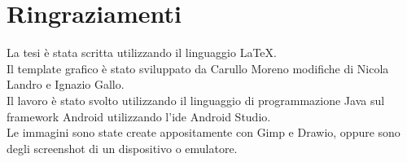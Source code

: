 \chapter*{Ringraziamenti}

La tesi è stata scritta utilizzando il linguaggio LaTeX.\\
Il template grafico è stato sviluppato da Carullo Moreno modifiche di Nicola Landro e Ignazio Gallo.\\
Il lavoro è stato svolto utilizzando il linguaggio di programmazione Java sul framework Android utilizzando l'ide Android Studio.\\
Le immagini sono state create appositamente con Gimp e Drawio, oppure sono degli screenshot di un dispositivo o emulatore.